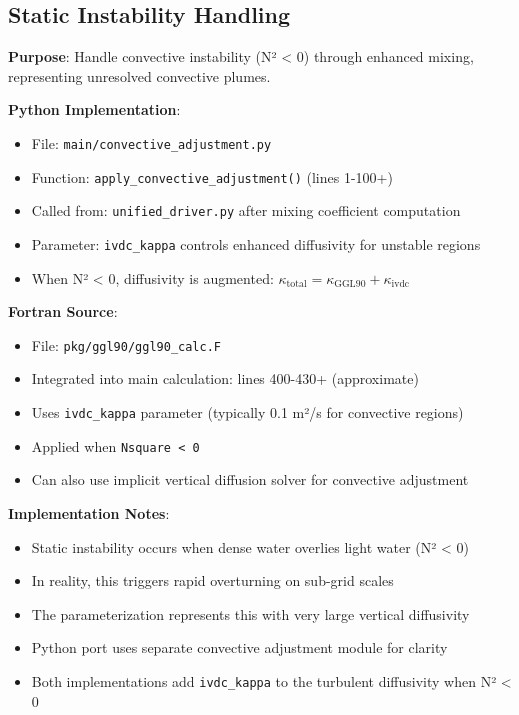 \documentclass[11pt]{article}
\begin{document}
\subsection{Static Instability Handling}

\textbf{Purpose}: Handle convective instability (N² < 0) through enhanced mixing, representing unresolved convective plumes.

\textbf{Python Implementation}:
\begin{itemize}
    \item File: \verb|main/convective_adjustment.py|
    \item Function: \verb|apply_convective_adjustment()| (lines 1-100+)
    \item Called from: \verb|unified_driver.py| after mixing coefficient computation
    \item Parameter: \verb|ivdc_kappa| controls enhanced diffusivity for unstable regions
    \item When N² < 0, diffusivity is augmented: $\kappa_{\text{total}} = \kappa_{\text{GGL90}} + \kappa_{\text{ivdc}}$
\end{itemize}

\textbf{Fortran Source}:
\begin{itemize}
    \item File: \verb|pkg/ggl90/ggl90_calc.F|
    \item Integrated into main calculation: lines 400-430+ (approximate)
    \item Uses \verb|ivdc_kappa| parameter (typically 0.1 m²/s for convective regions)
    \item Applied when \verb|Nsquare < 0|
    \item Can also use implicit vertical diffusion solver for convective adjustment
\end{itemize}

\textbf{Implementation Notes}:
\begin{itemize}
    \item Static instability occurs when dense water overlies light water (N² < 0)
    \item In reality, this triggers rapid overturning on sub-grid scales
    \item The parameterization represents this with very large vertical diffusivity
    \item Python port uses separate convective adjustment module for clarity
    \item Both implementations add \verb|ivdc_kappa| to the turbulent diffusivity when N² < 0
\end{itemize}
\end{document}
